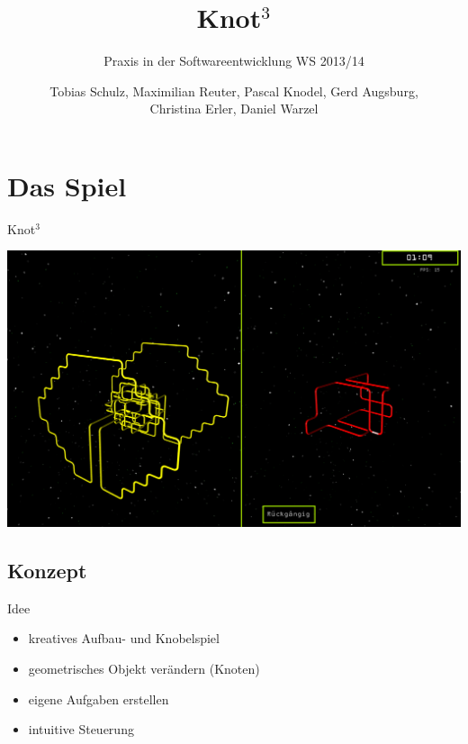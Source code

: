 \documentclass[18pt]{beamer}
\title[]{\huge{Knot$^3$} }
\subtitle{Praxis in der Softwareentwicklung WS 2013/14}
\author{Tobias Schulz, Maximilian Reuter, Pascal Knodel, Gerd Augsburg,\\ Christina Erler, Daniel Warzel}
\institute{Institut für Betriebs- und Dialogsysteme, Lehrstuhl für Computergrafik}
\begin{document}

\begin{frame}
\titlepage
\end{frame}


\section{Das Spiel}
\begin{frame}{Knot$^3$}

\begin{center}
 	\includegraphics[scale=0.35]{challange}
\end{center}


\end{frame}


\subsection{Konzept}
\begin{frame}{Idee}
\begin{itemize}
\item kreatives Aufbau- und Knobelspiel
\item geometrisches Objekt verändern (Knoten)
\item eigene Aufgaben erstellen
\item intuitive Steuerung
\end{itemize}
\end{frame}
\end{document}
